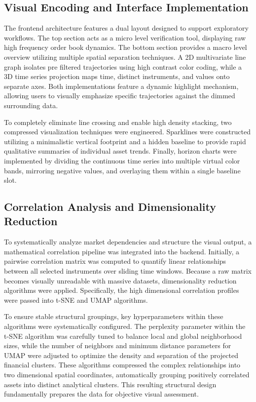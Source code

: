\documentclass[final,3p,times,twocolumn]{elsarticle}
\begin{document}
\subsection{Visual Encoding and Interface Implementation}\label{sec_visual_encoding}
The frontend architecture features a dual layout designed to support exploratory workflows. The top section acts as a micro level verification tool, displaying raw high frequency order book dynamics. The bottom section provides a macro level overview utilizing multiple spatial separation techniques. A 2D multivariate line graph isolates pre filtered trajectories using high contrast color coding, while a 3D time series projection maps time, distinct instruments, and values onto separate axes. Both implementations feature a dynamic highlight mechanism, allowing users to visually emphasize specific trajectories against the dimmed surrounding data. 

To completely eliminate line crossing and enable high density stacking, two compressed visualization techniques were engineered. Sparklines were constructed utilizing a minimalistic vertical footprint and a hidden baseline to provide rapid qualitative summaries of individual asset trends. Finally, horizon charts were implemented by dividing the continuous time series into multiple virtual color bands, mirroring negative values, and overlaying them within a single baseline slot.

\subsection{Correlation Analysis and Dimensionality Reduction}\label{sec_correlation_analysis}
To systematically analyze market dependencies and structure the visual output, a mathematical correlation pipeline was integrated into the backend. Initially, a pairwise correlation matrix was computed to quantify linear relationships between all selected instruments over sliding time windows. Because a raw matrix becomes visually unreadable with massive datasets, dimensionality reduction algorithms were applied. Specifically, the high dimensional correlation profiles were passed into t-SNE and UMAP algorithms. 

To ensure stable structural groupings, key hyperparameters within these algorithms were systematically configured. The perplexity parameter within the t-SNE algorithm was carefully tuned to balance local and global neighborhood sizes, while the number of neighbors and minimum distance parameters for UMAP were adjusted to optimize the density and separation of the projected financial clusters. These algorithms compressed the complex relationships into two dimensional spatial coordinates, automatically grouping positively correlated assets into distinct analytical clusters. This resulting structural design fundamentally prepares the data for objective visual assessment.
\end{document}

